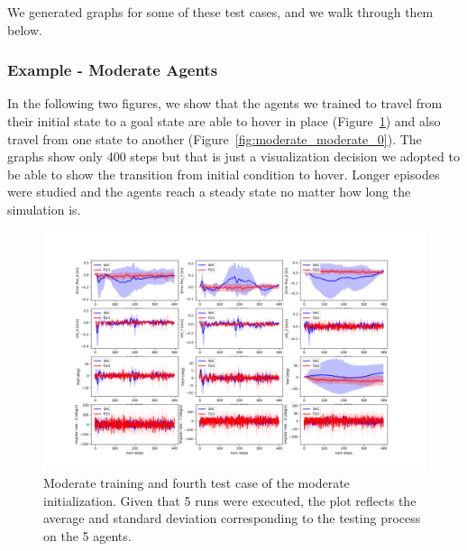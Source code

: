 We generated graphs for some of these test cases, and we walk through them below.

\subsubsection{Example - Moderate Agents}

In the following two figures, we show that the agents we trained to travel from their initial state to a goal state are able to hover in place (Figure~\ref{fig:moderate_vanilla_3}) and also travel from one state to another (Figure~\ref{fig:moderate_moderate_0}). The graphs 
show only 400 steps but that is just a visualization decision we adopted to be able to show the 
transition from initial condition to hover. Longer episodes were studied and the agents 
reach a steady state no matter how long the simulation is.

\begin{figure}[H]
    \includegraphics[width = 1\textwidth]{img/2022-05-05_00:00:00_moderate_states_3_vanilla.png}
    \caption{Moderate training and fourth test case of the moderate initialization. Given 
    that 5 runs were executed, the plot reflects the average and standard deviation 
    corresponding to the testing process on the 5 agents.}
    \label{fig:moderate_vanilla_3}
\end{figure}

